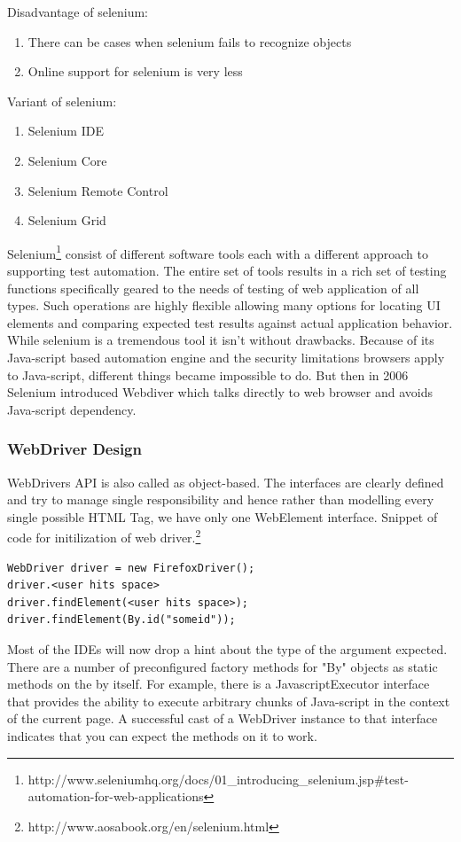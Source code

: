 \documentclass[article,type=msc,colorback,accentcolor=tud9c,twoside,11pt]{tudthesis}
\begin{document}
Disadvantage of selenium:
\begin{enumerate}
\item	There can be cases when selenium fails to recognize objects
\item Online support for selenium is very less
\end{enumerate}

Variant of selenium:
\begin{enumerate}
\item Selenium IDE
\item Selenium Core
\item Selenium Remote Control
\item Selenium Grid
\end{enumerate}

Selenium\footnote{http://www.seleniumhq.org/docs/01\_introducing\_selenium.jsp\#test-automation-for-web-applications} consist of different software tools each with a different approach to supporting test automation. The entire set of tools results in a rich set of testing functions specifically geared to the needs of testing of web application of all types. Such operations are highly flexible allowing many options for locating UI elements and comparing expected test results against actual application behavior. While selenium is a tremendous tool it isn't without drawbacks. Because of its Java-script based automation engine and the security limitations browsers apply to Java-script, different things became impossible to do. But then in 2006 Selenium introduced Webdiver which talks directly to web browser and avoids Java-script dependency.
\subsubsection{WebDriver Design}
WebDrivers API \cite{SeleniumTestingFramework} is also called as  object-based. The interfaces are clearly defined and try to manage single responsibility and hence rather than modelling every single possible HTML Tag, we have only one WebElement interface. Snippet of code for initilization of web driver.\footnote{http://www.aosabook.org/en/selenium.html}

\begin{lstlisting}
WebDriver driver = new FirefoxDriver();
driver.<user hits space>
driver.findElement(<user hits space>);
driver.findElement(By.id("someid"));
\end{lstlisting}
Most of the IDEs will now drop a hint about the type of the argument expected. There are a number of preconfigured factory methods for "By" objects as static methods on the by itself. For example, there is a JavascriptExecutor interface that provides the ability to execute arbitrary chunks of Java-script in the context of the current page. A successful cast of a WebDriver instance to that interface indicates that you can expect the methods on it to work.
\end{document}
